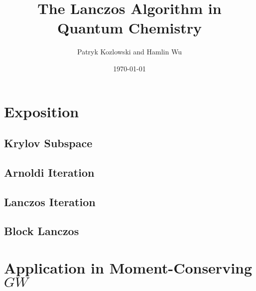 \documentclass[12pt]{article} %
\title{The Lanczos Algorithm in Quantum Chemistry}
\author{Patryk Kozlowski and Hamlin Wu}
\date{\today}
\begin{document}
\maketitle
\section{Exposition}
\subsection{Krylov Subspace}
\subsection{Arnoldi Iteration}
\subsection{Lanczos Iteration}
\subsection{Block Lanczos}
\section{Application in Moment-Conserving $GW$}
\end{document}
